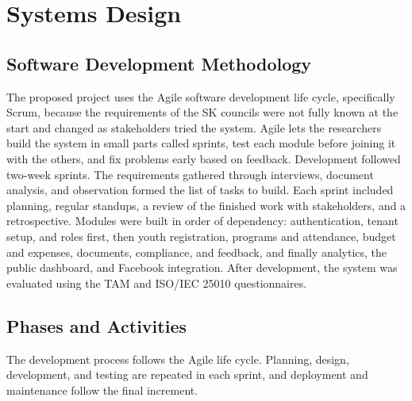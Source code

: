 \section{Systems Design}
\label{sec:systems_design}

\subsection{Software Development Methodology}
\label{subsec:software_dev_methodology}

\hspace*{\parindent}The proposed project uses the Agile software development life cycle, specifically Scrum, because the requirements of the SK councils were not fully known at the start and changed as stakeholders tried the system. Agile lets the researchers build the system in small parts called sprints, test each module before joining it with the others, and fix problems early based on feedback. Development followed two-week sprints. The requirements gathered through interviews, document analysis, and observation formed the list of tasks to build. Each sprint included planning, regular standups, a review of the finished work with stakeholders, and a retrospective. Modules were built in order of dependency: authentication, tenant setup, and roles first, then youth registration, programs and attendance, budget and expenses, documents, compliance, and feedback, and finally analytics, the public dashboard, and Facebook integration. After development, the system was evaluated using the TAM and ISO/IEC 25010 questionnaires.
\vspace{5mm}

\subsection{Phases and Activities}
\label{subsec:phases_and_activities}

\hspace*{\parindent}The development process follows the Agile life cycle. Planning, design, development, and testing are repeated in each sprint, and deployment and maintenance follow the final increment.
\vspace{5mm}

